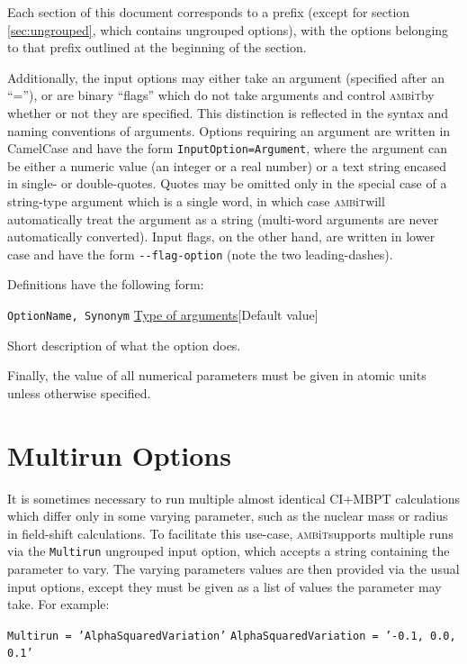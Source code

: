 \documentclass{report}
\newcommand{\ambit}{\textsc{amb}{\footnotesize i}\textsc{t}}
\begin{document}
Each section of this document corresponds to a prefix (except for section \ref{sec:ungrouped}, which
contains ungrouped options), with the options belonging to that prefix outlined at the beginning of the
section. 

Additionally, the input options may either take an argument (specified after an ``=''), or are binary
``flags'' which do not take arguments and control \ambit by whether or not they are specified. This
distinction is reflected in the syntax and naming conventions of arguments. Options requiring an
argument are written in CamelCase and have the form \texttt{InputOption=Argument}, where the argument
can be either a numeric value (an integer or a real number) or a text string encased in single- or
double-quotes. Quotes may be omitted only in the special case of a string-type argument which is a
single word, in which case \ambit will automatically treat the argument as a string (multi-word
arguments are never automatically converted). Input flags, on the other hand, are written in lower case 
and have the form \texttt{{-}{-}flag-option} (note the two leading-dashes). 

Definitions have the following form:

\texttt{OptionName, Synonym} \uline{Type of arguments}[Default value]
\begin{adjustwidth}{1cm}{}
Short description of what the option does.
\end{adjustwidth}

Finally, the value of all numerical parameters must be given in atomic units unless otherwise specified.

\section{Multirun Options}

\label{sec:multirun}

It is sometimes necessary to run multiple almost identical CI+MBPT calculations which differ only in
some varying parameter, such as the nuclear mass or radius in field-shift calculations. To facilitate
this use-case, \ambit supports multiple runs via the \texttt{Multirun} ungrouped input option, which
accepts a string containing the parameter to vary. The varying parameters values are then provided via 
the usual input options, except they must be given as a list of values the parameter may take. For 
example:

\texttt{Multirun = 'AlphaSquaredVariation'}
\texttt{AlphaSquaredVariation = '-0.1, 0.0, 0.1'}
\end{document}
